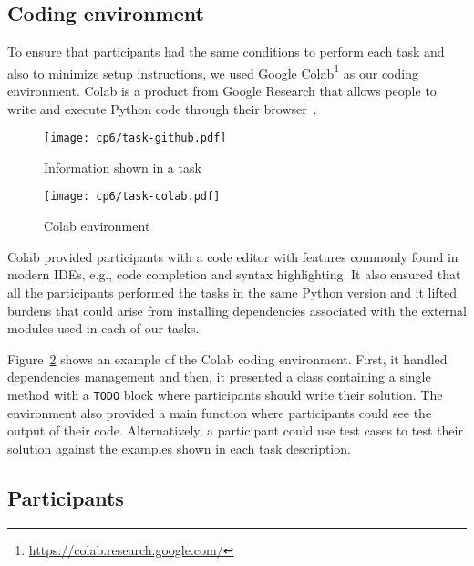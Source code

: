 


\subsection{Coding environment}
\label{cp6:coding-environment}



To ensure that participants had the same conditions to perform each task
and also to minimize setup instructions, we used Google Colab\footnote{\url{https://colab.research.google.com/}} as our coding environment. 
Colab is a product from Google Research that allows people to write and execute Python code through their browser~\cite{google-colab}. 



\begin{figure}
    \centering
    \texttt{[image: cp6/task-github.pdf]}
    \caption{Information shown in a task}
    \label{fig:nytimes-task-github}
\end{figure}


\begin{figure}
    \centering
    \texttt{[image: cp6/task-colab.pdf]}
    \caption{Colab environment}
    \label{fig:nytimes-task-colab}
\end{figure}



Colab provided participants with a code editor with features commonly found in modern IDEs, e.g., code completion and syntax highlighting. It also ensured that all the participants 
performed the tasks in the same Python version and it lifted 
burdens that could arise from installing dependencies associated with the external modules used in each of our tasks. 


Figure~\ref{fig:nytimes-task-colab} shows an example of the Colab coding environment. 
First, it handled dependencies management and then, 
it presented a class containing a single method with a \texttt{TODO} block where 
participants should write their solution. 
The environment also provided a main function where participants could see the output
of their code. Alternatively, a participant could use test cases to test their solution
against the examples shown in each task description.




\subsection{Participants}
\label{cp6:participants}


